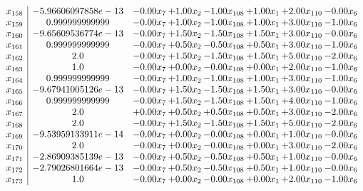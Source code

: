 \documentclass[8pt]{article}
\begin{document}
\[\begin{array}{c| c c@{\hskip 2pt} c@{\hskip 2pt} c@{\hskip 2pt} c@{\hskip 2pt} c@{\hskip 2pt} c@{\hskip 2pt} }
 x_{158}   &  -5.96606097858e-13 & -0.00 x_{7} & +  1.00 x_{2} & -1.00 x_{108} & +  1.00 x_{1} & +  2.00 x_{110} & -0.00 x_{6}\\
 x_{159}   &  0.999999999999 & -0.00 x_{7} & +  1.00 x_{2} & -1.00 x_{108} & +  1.00 x_{1} & +  3.00 x_{110} & -1.00 x_{6}\\
 x_{160}   &  -9.65609536774e-13 & -0.00 x_{7} & +  1.50 x_{2} & -1.50 x_{108} & +  1.50 x_{1} & +  3.00 x_{110} & -0.00 x_{6}\\
 x_{161}   &  0.999999999999 & -0.00 x_{7} & +  0.50 x_{2} & -0.50 x_{108} & +  0.50 x_{1} & +  3.00 x_{110} & -1.00 x_{6}\\
 x_{162}   &  2.0 & -0.00 x_{7} & +  1.50 x_{2} & -1.50 x_{108} & +  1.50 x_{1} & +  5.00 x_{110} & -2.00 x_{6}\\
 x_{163}   &  1.0 & -0.00 x_{7} & +  0.00 x_{2} & -0.00 x_{108} & +  0.00 x_{1} & +  2.00 x_{110} & -1.00 x_{6}\\
 x_{164}   &  0.999999999999 & -0.00 x_{7} & +  1.00 x_{2} & -1.00 x_{108} & +  1.00 x_{1} & +  3.00 x_{110} & -1.00 x_{6}\\
 x_{165}   &  -9.67941005126e-13 & -0.00 x_{7} & +  1.50 x_{2} & -1.50 x_{108} & +  1.50 x_{1} & +  3.00 x_{110} & -0.00 x_{6}\\
 x_{166}   &  0.999999999999 & -0.00 x_{7} & +  1.50 x_{2} & -1.50 x_{108} & +  1.50 x_{1} & +  4.00 x_{110} & -1.00 x_{6}\\
 x_{167}   &  2.0 & +  0.00 x_{7} & +  0.50 x_{2} & +  0.50 x_{108} & +  0.50 x_{1} & +  3.00 x_{110} & -2.00 x_{6}\\
 x_{168}   &  2.0 & -0.00 x_{7} & +  1.50 x_{2} & -1.50 x_{108} & +  1.50 x_{1} & +  5.00 x_{110} & -2.00 x_{6}\\
 x_{169}   &  -9.53959133911e-14 & -0.00 x_{7} & +  0.00 x_{2} & -0.00 x_{108} & +  0.00 x_{1} & +  1.00 x_{110} & -0.00 x_{6}\\
 x_{170}   &  2.0 & -0.00 x_{7} & +  0.00 x_{2} & -0.00 x_{108} & +  0.00 x_{1} & +  3.00 x_{110} & -2.00 x_{6}\\
 x_{171}   &  -2.86909385139e-13 & -0.00 x_{7} & +  0.50 x_{2} & -0.50 x_{108} & +  0.50 x_{1} & +  1.00 x_{110} & -0.00 x_{6}\\
 x_{172}   &  -2.79026801664e-13 & -0.00 x_{7} & +  0.50 x_{2} & -0.50 x_{108} & +  0.50 x_{1} & +  1.00 x_{110} & -0.00 x_{6}\\
 x_{173}   &  1.0 & -0.00 x_{7} & +  0.00 x_{2} & -0.00 x_{108} & +  0.00 x_{1} & +  2.00 x_{110} & -1.00 x_{6}\\

\end{array}\]
\end{document}
